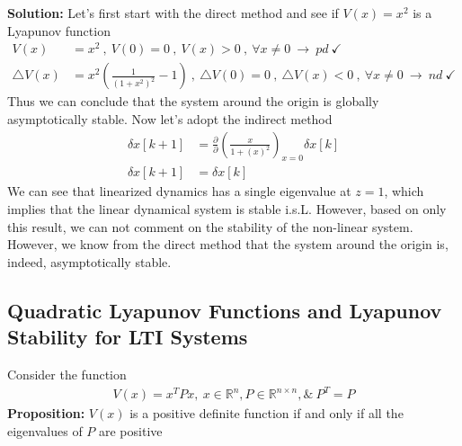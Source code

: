 \documentclass[twoside]{article}
\begin{document}
\textbf{Solution:} Let's first start with the direct method and see if $V(x) = x^2$ is a Lyapunov function
%
\begin{align*}
V(x) &= x^2 \ , \ V(0) = 0 \ , \ V(x) > 0 \ , \ \forall x \neq 0 \ \rightarrow \ pd \ \checkmark
\\
\triangle V(x) &= x^2 \left( \frac{1}{(1 + x^2)^2} - 1 \right)  \ , \ \triangle V(0) = 0 \ , \ \triangle V(x) < 0 \ , \ \forall x \neq 0 \ \rightarrow \ nd \ \checkmark
\end{align*}
%
Thus we can conclude that the system around the origin is globally asymptotically stable. Now
let's adopt the indirect method
%
\begin{align*}
 \delta x[k+1] &= \frac{\partial 
 }{\partial} \left(
 \frac{x}{1 + (x)^2} \right)_{x=0} \delta x[k]
 \\
\delta x[k+1] &= \delta x[k]
\end{align*}
%
We can see that linearized dynamics has a single eigenvalue at $z = 1$, which implies that the linear dynamical system is stable i.s.L. However, based on only this result, we can not comment on the stability of the non-linear system. However, we know from the direct method that the system around the origin is, indeed, asymptotically stable.

\subsection{Quadratic Lyapunov Functions and Lyapunov Stability for LTI Systems}

Consider the function
%
\begin{align*}
V(x) = x^T P x , \ x \in \mathbb{R}^{n} , P \in \mathbb{R}^{n \times n} , \& \ P^T = P
\end{align*}
%
\textbf{Proposition:} $V(x)$ is a positive definite function if and only if all the eigenvalues of 
$P$ are positive
\end{document}
